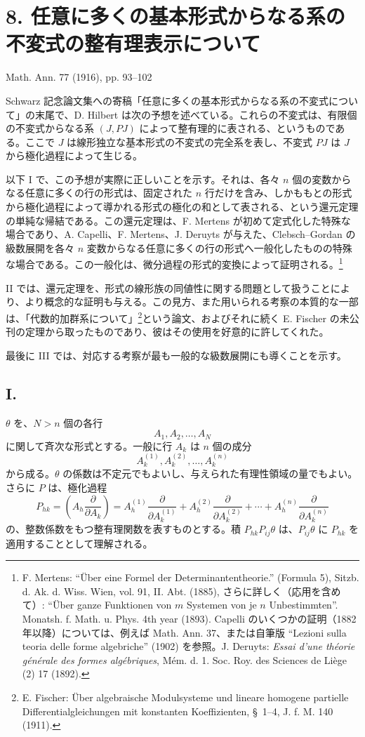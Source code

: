 \section*{8. 任意に多くの基本形式からなる系の不変式の整有理表示について}
\begin{center}
Math. Ann. 77 (1916), pp. 93--102
\end{center}

Schwarz 記念論文集への寄稿「任意に多くの基本形式からなる系の不変式について」の末尾で、D. Hilbert は次の予想を述べている。これらの不変式は、有限個の不変式からなる系 $(J,PJ)$ によって整有理的に表される、というものである。ここで $J$ は線形独立な基本形式の不変式の完全系を表し、不変式 $PJ$ は $J$ から極化過程によって生じる。

以下 I で、この予想が実際に正しいことを示す。それは、各々 $n$ 個の変数からなる任意に多くの行の形式は、固定された $n$ 行だけを含み、しかももとの形式から極化過程によって導かれる形式の極化の和として表される、という還元定理の単純な帰結である。この還元定理は、F. Mertens が初めて定式化した特殊な場合であり、A. Capelli、F. Mertens、J. Deruyts が与えた、Clebsch--Gordan の級数展開を各々 $n$ 変数からなる任意に多くの行の形式へ一般化したものの特殊な場合である。この一般化は、微分過程の形式的変換によって証明される。\footnote{F. Mertens: ``Über eine Formel der Determinantentheorie.'' (Formula 5), Sitzb. d. Ak. d. Wiss. Wien, vol. 91, II. Abt. (1885), さらに詳しく（応用を含めて）: ``Über ganze Funktionen von $m$ Systemen von je $n$ Unbestimmten''. Monatsh. f. Math. u. Phys. 4th year (1893). Capelli のいくつかの証明（1882 年以降）については、例えば Math. Ann. 37、または自筆版 ``Lezioni sulla teoria delle forme algebriche'' (1902) を参照。J. Deruyts: \emph{Essai d'une théorie générale des formes algébriques}, Mém. d. 1. Soc. Roy. des Sciences de Liège (2) 17 (1892).}

II では、還元定理を、形式の線形族の同値性に関する問題として扱うことにより、より概念的な証明も与える。この見方、また用いられる考察の本質的な一部は、「代数的加群系について」\footnote{E. Fischer: Über algebraische Modulsysteme und lineare homogene partielle Differentialgleichungen mit konstanten Koeffizienten, \S\ 1--4, J. f. M. 140 (1911).}という論文、およびそれに続く E. Fischer の未公刊の定理から取ったものであり、彼はその使用を好意的に許してくれた。

最後に III では、対応する考察が最も一般的な級数展開にも導くことを示す。

\subsection*{I.}
$\theta$ を、$N>n$ 個の各行
\[
  A_1,A_2,\ldots,A_N
\]
に関して斉次な形式とする。一般に行 $A_k$ は $n$ 個の成分
\[
  A_k^{(1)},A_k^{(2)},\ldots,A_k^{(n)}
\]
から成る。$\theta$ の係数は不定元でもよいし、与えられた有理性領域の量でもよい。さらに $P$ は、極化過程
\[
  P_{hk}=\left(A_h\frac{\partial}{\partial A_k}\right)
  =A_h^{(1)}\frac{\partial}{\partial A_k^{(1)}}+
   A_h^{(2)}\frac{\partial}{\partial A_k^{(2)}}+
   \cdots+
   A_h^{(n)}\frac{\partial}{\partial A_k^{(n)}}
\]
の、整数係数をもつ整有理関数を表すものとする。積 $P_{hk}P_{ij}\theta$ は、$P_{ij}\theta$ に $P_{hk}$ を適用することとして理解される。

